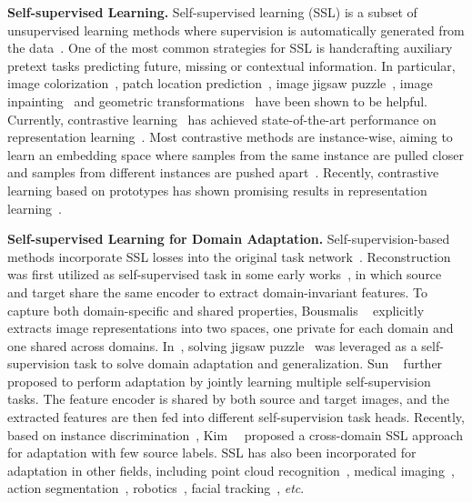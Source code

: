 \documentclass[final]{cvpr}
\begin{document}
\noindent\textbf{Self-supervised Learning.} Self-supervised learning (SSL) is a subset of unsupervised learning methods where supervision is automatically generated from the data~\cite{jing2020self, doersch2015unsupervised, zhang2016colorful,noroozi2016unsupervised,gidaris2018unsupervised,wang2020pre}. One of the most common strategies for SSL is handcrafting auxiliary pretext tasks predicting future, missing or contextual information. In particular, image colorization~\cite{zhang2016colorful, larsson2016learning}, patch location prediction~\cite{doersch2015unsupervised, doersch2017multi}, image jigsaw puzzle~\cite{noroozi2016unsupervised}, image inpainting~\cite{pathak2016context} and geometric transformations~\cite{gidaris2018unsupervised,dosovitskiy2014discriminative} have been shown to be helpful. 
Currently, contrastive learning~\cite{bachman2019learning, he2020momentum, oord2018representation,tian2019contrastive, misra2020self} has achieved state-of-the-art performance on representation learning~\cite{grill2020bootstrap, chen2020simple, chen2020improved, chen2020big}. Most contrastive methods are instance-wise, aiming to learn an embedding space where samples from the same instance are pulled closer and samples from different instances are pushed apart~\cite{wu2018unsupervised, chen2020simple}. Recently, contrastive learning based on prototypes has shown promising results in representation learning~\cite{li2020prototypical, asano2020self, caron2020unsupervised, garnot2020metric}. 





\noindent\textbf{Self-supervised Learning for Domain Adaptation.}
Self-supervision-based methods incorporate SSL losses into the original task network~\cite{ghifary2015domain, ghifary2016deep}. Reconstruction was first utilized as self-supervised task in some early works~\cite{ghifary2015domain, ghifary2016deep}, in which source and target share the same encoder to extract domain-invariant features. 
To capture both domain-specific and shared properties, Bousmalis \etal~\cite{bousmalis2017unsupervised} explicitly extracts image representations into two spaces, one private for each domain and one shared across domains.
In~\cite{carlucci2019domain}, solving jigsaw puzzle~\cite{noroozi2016unsupervised} was leveraged as a self-supervision task to solve domain adaptation and generalization. Sun \etal~\cite{sun2019unsupervised} further proposed to perform adaptation by jointly learning multiple self-supervision tasks. The feature encoder is shared by both source and target images, and the extracted features are then fed into different self-supervision task heads. Recently, based on instance discrimination~\cite{wu2018unsupervised}, Kim~\etal~\cite{kim2020cross} proposed a cross-domain SSL approach for adaptation with few source labels. SSL has also been incorporated for adaptation in other fields, including point cloud recognition~\cite{achituve2020self}, medical imaging~\cite{ihler2020self}, action segmentation~\cite{chen2020action}, robotics~\cite{jeong2020self}, facial tracking~\cite{yoon2019self}, \textit{etc}.
\end{document}
